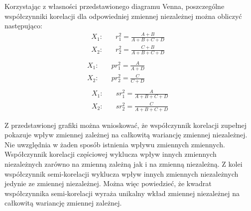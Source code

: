\begin{appendices}
Korzystając z własności przedstawionego diagramu Venna, poszczególne współczynniki korelacji dla odpowiedniej zmiennej niezależnej można obliczyć następująco:
\begin{equation}
	\begin{split}
		X_1:\quad& r_1^2 = \frac{A+B}{A+B+C+D} \phantom{\;\;}\\
		X_2:\quad& r_2^2 = \frac{C+B}{A+B+C+D} \\
	\end{split}
\end{equation}
\begin{equation}
	\begin{split}
		X_1:\quad& pr_1^2 = \frac{A}{A+D} \phantom{\qquad\qquad}\\
		X_2:\quad& pr_2^2 = \frac{C}{C+D} \\
	\end{split}
\end{equation}
\begin{equation}
	\begin{split}
		X_1:\quad& sr_1^2 = \frac{A}{A+B+C+D} \\
		X_2:\quad& sr_2^2 = \frac{C}{A+B+C+D} 
	\end{split}
\end{equation}

Z przedstawionej grafiki można wnioskować, że współczynnik korelacji zupełnej pokazuje wpływ zmiennej zależnej na całkowitą wariancję zmiennej niezależnej. Nie uwzględnia w żaden sposób istnienia wpływu zmiennych zmiennych. Współczynnik korelacji częściowej wyklucza wpływ innych zmiennych niezależnych zarówno na zmienną zależną jak i na zmienną niezależną. Z kolei współczynnik semi-korelacji wyklucza wpływ innych zmiennych niezależnych jedynie ze zmiennej niezależnej. Można więc powiedzieć, że kwadrat współczynnika semi-korelacji wyraża unikalny wkład zmiennej niezależnej na całkowitą wariancję zmiennej zależnej.






\end{appendices}